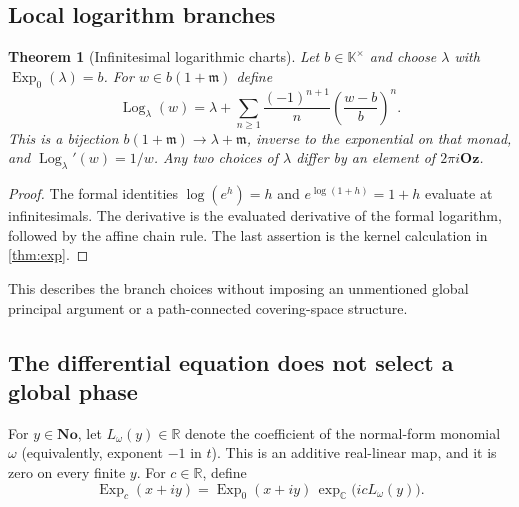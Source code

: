 \documentclass[11pt,oneside]{article}
\numberwithin{equation}{section}
\newtheorem{theorem}{Theorem}[section]
\theoremstyle{definition}
\theoremstyle{remark}\newtheorem{remark}[theorem]{Remark}
\newcommand{\No}{\mathbf{No}}
\newcommand{\Oz}{\mathbf{Oz}}
\newcommand{\K}{\mathbb K}
\newcommand{\C}{\mathbb C}
\newcommand{\R}{\mathbb R}
\newcommand{\m}{\mathfrak m}
\newcommand{\Exp}{\operatorname{Exp}}
\newcommand{\Log}{\operatorname{Log}}
\begin{document}
\subsection{Local logarithm branches}
\begin{theorem}[Infinitesimal logarithmic charts]\label{thm:log}
Let $b\in\K^\times$ and choose $\lambda$ with $\Exp_0(\lambda)=b$.
For $w\in b(1+\m)$ define
\[
 \Log_\lambda(w)=\lambda+
   \sum_{n\geq1}\frac{(-1)^{n+1}}n\left(\frac{w-b}{b}\right)^n.
\]
This is a bijection $b(1+\m)\to\lambda+\m$, inverse to the exponential
on that monad, and $\Log_\lambda'(w)=1/w$.
Any two choices of $\lambda$ differ by an element of $2\pi i\Oz$.
\end{theorem}
\begin{proof}
The formal identities $\log(e^h)=h$ and $e^{\log(1+h)}=1+h$ evaluate
at infinitesimals. The derivative is the evaluated derivative of the
formal logarithm, followed by the affine chain rule. The last assertion
is the kernel calculation in \cref{thm:exp}.
\end{proof}
This describes the branch choices without imposing an unmentioned
global principal argument or a path-connected covering-space structure.

\subsection{The differential equation does not select a global phase}
For $y\in\No$, let $L_\omega(y)\in\R$ denote the coefficient of the
normal-form monomial $\omega$ (equivalently, exponent $-1$ in $t$).
This is an additive real-linear map, and it is zero on every finite $y$.
For $c\in\R$, define
\begin{equation}\label{eq:twistedexp}
 \Exp_c(x+iy)=\Exp_0(x+iy)\,
           \exp_{\C}\bigl(icL_\omega(y)\bigr).
\end{equation}
\end{document}
